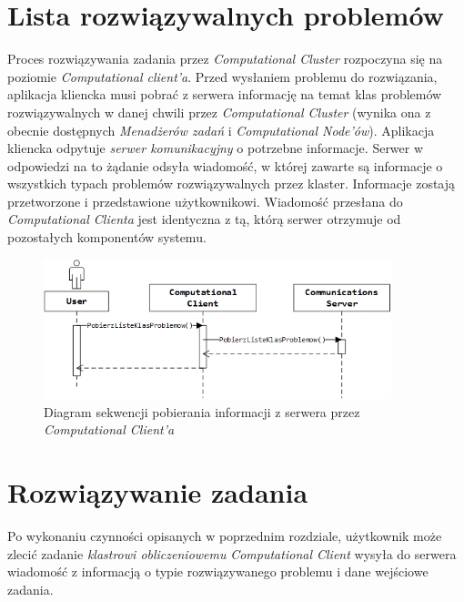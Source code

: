 \documentclass[12pt,a4paper,titlepage]{report}
\begin{document}
	\section{Lista rozwiązywalnych problemów}
	Proces rozwiązywania zadania przez \textit{Computational Cluster} rozpoczyna się na poziomie \textit{Computational client'a}. Przed
	wysłaniem problemu do rozwiązania, aplikacja kliencka musi pobrać z serwera informację na temat klas problemów
	rozwiązywalnych w danej chwili przez \textit{Computational Cluster} (wynika ona z obecnie dostępnych \textit{Menadżerów zadań} i
	\textit{Computational Node'ów}). Aplikacja kliencka odpytuje \textit{serwer komunikacyjny} o potrzebne informacje. 
	Serwer w odpowiedzi na to żądanie odsyła wiadomość, w której zawarte są informacje o wszystkich typach problemów
	rozwiązywalnych przez klaster. Informacje zostają przetworzone i przedstawione użytkownikowi. Wiadomość przesłana do 
	\textit{Computational Clienta} jest identyczna z tą, którą serwer otrzymuje od pozostałych komponentów systemu.
	
	\begin{figure}[h]
		\centering
		\caption{Diagram sekwencji pobierania informacji z serwera przez \textit{Computational Client'a}}
		\includegraphics[width=0.9\textwidth]{img/communication/problemclass.png}
	\end{figure}	
	
	\section{Rozwiązywanie zadania}
	
	Po wykonaniu czynności opisanych w poprzednim rozdziale, użytkownik może zlecić zadanie \textit{klastrowi obliczeniowemu}
    \textit{Computational Client} wysyła do serwera wiadomość z informacją o typie rozwiązywanego problemu i dane wejściowe zadania.\\
    
    
    
\end{document}
